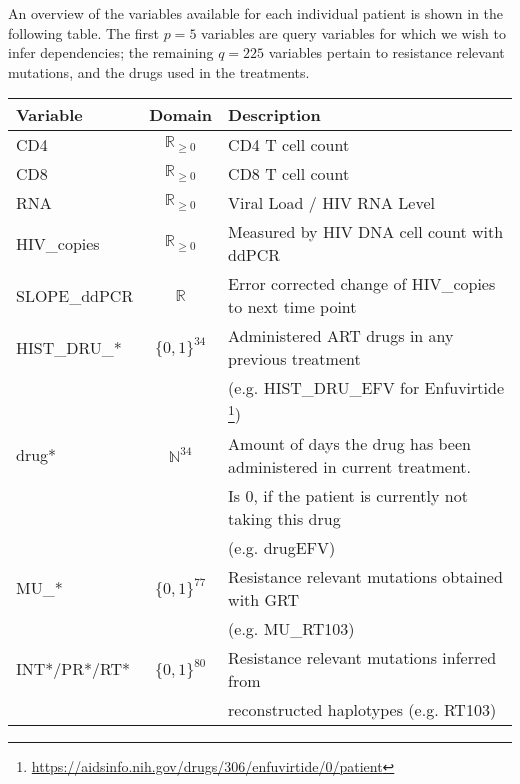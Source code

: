 An overview of the variables available for each individual patient is shown in the following table.
The first $p=5$ variables are query variables for which we wish to infer dependencies; the remaining $q=225$ variables pertain to resistance relevant mutations, and the drugs used in the treatments.
\begin{table}[H]
	\begin{tabular}{lcl}
		\textbf{Variable} & \textbf{Domain}      & \textbf{Description}                                                 
		\\
		\toprule
		CD4               & $\mathbb{R}_{\geq0}$ & CD4 T cell count                                                     \\
		CD8               & $\mathbb{R}_{\geq0}$ & CD8 T cell count                                                     \\
		RNA               & $\mathbb{R}_{\geq0}$ & Viral Load / HIV RNA Level                                           \\
		HIV\_copies       & $\mathbb{R}_{\geq0}$ & Measured by HIV DNA cell count with ddPCR                            \\
		SLOPE\_ddPCR      & $\mathbb{R}$         & Error corrected change of HIV\_copies to next time point             \\
		\midrule
		HIST\_DRU\_*      & $\{0,1\}^{34}$         & Administered ART drugs in any previous treatment               
		\\
		&                      & (e.g. HIST\_DRU\_EFV for Enfuvirtide                                 
		\footnote{\href{https://aidsinfo.nih.gov/drugs/306/enfuvirtide/0/patient}{https://aidsinfo.nih.gov/drugs/306/enfuvirtide/0/patient}})
		\\
		drug*            & $\mathbb{N}^{34}$         & Amount of days the drug has been administered in current treatment.
		\\&& Is 0, if the patient is currently not taking this drug 
		\\&&(e.g. drugEFV)                          
		\\
		MU\_*             & $\{0,1\}^{77}$         & Resistance relevant mutations obtained with \gls{GRT}
		\\
		&                      & (e.g. MU\_RT103)                                                     \\
		INT*/PR*/RT*      & $\{0,1\}^{80}$         & Resistance relevant mutations inferred from 
		\\
		&                      & reconstructed haplotypes (e.g. RT103)                                                         
	\end{tabular}
\end{table}

